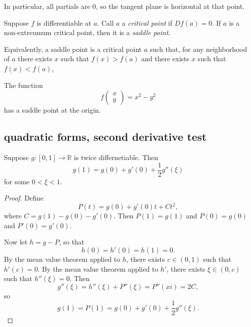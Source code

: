 \documentclass[12pt]{article}
\begin{document}
\begin{remark}
	In particular, all partials are $0$, so the tangent plane is horizontal at that point.
\end{remark}

\begin{definition}
	Suppose $f$ is differentiable at $a$. Call $a$ a \emph{critical point} if $Df(a)=0$. If $a$ is a non-extreumum critical point, then it is a \emph{saddle point}. 

	Equivalently, a saddle point is a critical point $a$ such that, for any neighborhood of $a$ there exists $x$ such that $f(x)>f(a)$ and there exists $x$ such that $f(x)<f(a)$, 
\end{definition}

\begin{example}
	The function 
	\begin{equation*}
		f\begin{pmatrix}x \\ y\end{pmatrix} = x^2-y^2
	\end{equation*}
	has a saddle point at the origin.
\end{example}


\subsection{quadratic forms, second derivative test} %

\begin{lemma}
	Suppose $g:[0,1]\to \mathbb{R}$ is twice differnetiable. Then 
	\begin{equation*}
		g(1)=g(0)+g'(0)+\frac{1}{2}g''(\xi)
	\end{equation*}
	for some $0<\xi<1$.
\end{lemma}
\begin{proof} 
	Define 
	\begin{equation*}
		P(t) = g(0)+g'(0)t+Ct^2,
	\end{equation*}
	where $C=g(1)-g(0)-g'(0)$. Then $P(1)=g(1)$ and $P(0)=g(0)$ and $P'(0)=g'(0)$.

	Now let $h=g-P$, so that 
	\begin{equation*}
		h(0)=h'(0)=h(1)=0.
	\end{equation*}
	By the mean value theorem applied to $h$, there exists $c\in (0,1)$ such that $h'(c)=0$. By the mean value theorem applied to $h'$, there exists $\xi\in (0,c)$ such that $h''(\xi)=0$. Then 
	\begin{equation*}
		g''(\xi)=h''(\xi)+P''(\xi)=P''(xi)=2C,
	\end{equation*}
	so 
	\begin{equation*}
		g(1)=P(1)=g(0)+g'(0)+\frac{1}{2}g''(\xi).
	\end{equation*}
\end{proof}	
\end{document}
